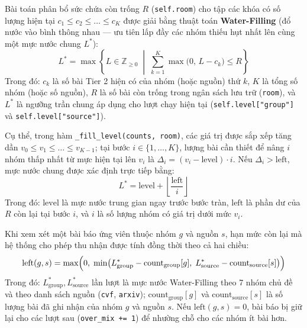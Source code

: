 Bài toán phân bổ sức chứa còn trống $R$ (\texttt{self.room}) cho tập các khóa có số lượng hiện tại $c_1 \le c_2 \le \dots \le c_K$ được giải bằng thuật toán \textbf{Water-Filling} (đổ nước vào bình thông nhau --- ưu tiên lấp đầy các nhóm thiếu hụt nhất lên cùng một mực nước chung $L^*$):
\begin{equation}
  L^* = \max \left\{ L \in \mathbb{Z}_{\ge 0} \;\middle|\; \sum_{k=1}^{K} \max\bigl(0,\, L - c_k\bigr) \le R \right\}
  \label{eq:ch2_waterfill_def}
\end{equation}
\noindent Trong đó: $c_k$ là số bài Tier 2 hiện có của nhóm (hoặc nguồn) thứ $k$, $K$ là tổng số nhóm (hoặc số nguồn), $R$ là số bài còn trống trong ngân sách lưu trữ (\texttt{room}), và $L^*$ là ngưỡng trần chung áp dụng cho lượt chạy hiện tại (\texttt{self.level["group"]} và \texttt{self.level["source"]}).

Cụ thể, trong hàm \texttt{\_fill\_level(counts, room)}, các giá trị được sắp xếp tăng dần $v_0 \le v_1 \le \dots \le v_{K-1}$; tại bước $i \in \{1,\dots,K\}$, lượng bài cần thiết để nâng $i$ nhóm thấp nhất từ mực hiện tại lên $v_i$ là $\Delta_i = (v_i - \text{level}) \cdot i$. Nếu $\Delta_i > \text{left}$, mực nước chung được xác định trực tiếp bằng:
\begin{equation}
  L^* = \text{level} + \left\lfloor \frac{\text{left}}{i} \right\rfloor
  \label{eq:ch2_waterfill_step}
\end{equation}
\noindent Trong đó: $\text{level}$ là mực nước trung gian ngay trước bước tràn, $\text{left}$ là phần dư của $R$ còn lại tại bước $i$, và $i$ là số lượng nhóm có giá trị dưới mức $v_i$.

Khi xem xét một bài báo ứng viên thuộc nhóm $g$ và nguồn $s$, hạn mức còn lại mà hệ thống cho phép thu nhận được tính đồng thời theo cả hai chiều:
\begin{equation}
  \text{left}(g, s) = \max\Bigl(0,\; \min\bigl(L_{\text{group}}^* - \text{count}_{\text{group}}[g],\; L_{\text{source}}^* - \text{count}_{\text{source}}[s]\bigr)\Bigr)
  \label{eq:ch2_waterfill_left}
\end{equation}
\noindent Trong đó: $L_{\text{group}}^*, L_{\text{source}}^*$ lần lượt là mực nước Water-Filling theo 7 nhóm chủ đề và theo danh sách nguồn (\texttt{cvf}, \texttt{arxiv}); $\text{count}_{\text{group}}[g]$ và $\text{count}_{\text{source}}[s]$ là số lượng bài đã ghi nhận của nhóm $g$ và nguồn $s$. Nếu $\text{left}(g, s) = 0$, bài báo bị giữ lại cho các lượt sau (\texttt{over\_mix += 1}) để nhường chỗ cho các nhóm ít bài hơn.

